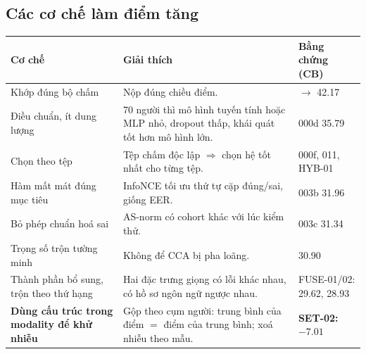 \documentclass[11pt,a4paper,oneside]{report}
\begin{document}
\subsection{Các cơ chế làm điểm tăng}
\begin{center}
\begin{tabular}{>{\raggedright}p{4.2cm}>{\raggedright}p{6.9cm}>{\raggedright\arraybackslash}p{3.6cm}}
\toprule
Cơ chế & Giải thích & Bằng chứng (CB) \\
\midrule
Khớp đúng bộ chấm & Nộp đúng chiều điểm. & 57.83 $\to$ 42.17 \\
Điều chuẩn, ít dung lượng & 70 người thì mô hình tuyến tính hoặc MLP nhỏ, dropout thấp, khái quát tốt hơn mô hình lớn. & 000d 35.79 \\
Chọn theo tệp & Tệp chấm độc lập $\Rightarrow$ chọn hệ tốt nhất cho từng tệp. & 000f, 011, HYB-01 \\
Hàm mất mát đúng mục tiêu & InfoNCE tối ưu thứ tự cặp đúng/sai, giống EER. & 003b 31.96 \\
Bỏ phép chuẩn hoá sai & AS-norm có cohort khác với lúc kiểm thử. & 003c 31.34 \\
Trọng số trộn tường minh & Không để CCA bị pha loãng. & 007 30.90 \\
Thành phần bổ sung, trộn theo thứ hạng & Hai đặc trưng giọng có lỗi khác nhau, có hồ sơ ngôn ngữ ngược nhau. & FUSE-01/02: 29.62, 28.93 \\
\textbf{Dùng cấu trúc trong modality để khử nhiễu} & Gộp theo cụm người: trung bình của điểm $=$ điểm của trung bình; xoá nhiễu theo mẫu. & \textbf{SET-02: $-7.01$} \\
\bottomrule
\end{tabular}
\end{center}
\end{document}
